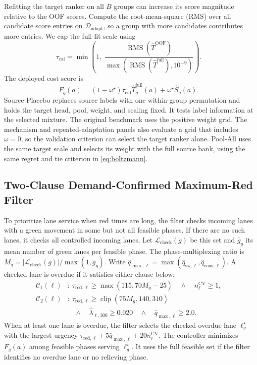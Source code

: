 \documentclass[letterpaper,journal]{IEEEtran}
\DeclareMathOperator{\RMS}{RMS}
\DeclareMathOperator{\clip}{clip}
\begin{document}
Refitting the target ranker on all $B$ groups can increase its score magnitude relative to the OOF scores. Compute the root-mean-square (RMS) over all candidate score entries on $\mathcal{D}_{\mathrm{adapt}}$, so a group with more candidates contributes more entries. We cap the full-fit scale using
\begin{equation}
  \tau_{\mathrm{cal}}=\min\!\left(1,\;
       \frac{\RMS(\widehat T^{\mathrm{OOF}})}
            {\max(\RMS(\widehat T^{\mathrm{full}}),10^{-9})}\right).
  \label{eq:tau_cal}
\end{equation}
The deployed cost score is
\begin{equation}
  F_g(a)=(1-\omega^\star)\tau_{\mathrm{cal}}\widehat T_g^{\mathrm{full}}(a)
     +\omega^\star\widehat S_g(a).
  \label{eq:calibrated_blend}
\end{equation}
Source-Placebo replaces source labels with one within-group permutation and holds the target head, pool, weight, and scaling fixed. It tests label information at the selected mixture. The original benchmark uses the positive weight grid. The mechanism and repeated-adaptation panels also evaluate a grid that includes $\omega=0$, so the validation criterion can select the target ranker alone. Pool-All uses the same target scale and selects its weight with the full source bank, using the same regret and tie criterion in \eqref{eq:boltzmann}.

\subsection{Two-Clause Demand-Confirmed Maximum-Red Filter}
To prioritize lane service when red times are long, the filter checks incoming lanes with a green movement in some but not all feasible phases. If there are no such lanes, it checks all controlled incoming lanes. Let $\mathcal{L}_{\mathrm{check}}(g)$ be this set and $\bar g_g$ its mean number of green lanes per feasible phase. The phase-multiplexing ratio is $M_g=|\mathcal{L}_{\mathrm{check}}(g)|/\max(1,\bar g_g)$. Write $\hat q_{\max,\ell}=\max(\hat q_{\mathrm{sw},\ell},\hat q_{\mathrm{cons},\ell})$. A checked lane is overdue if it satisfies either clause below:
\begin{align}
  \mathcal{C}_1(\ell) &:~ \tau_{\mathrm{red},\ell}\ge\max(115,70M_g-25)
      \quad\wedge\quad n_\ell^{\mathrm{CV}}\ge1,\label{eq:clause1}\\
  \mathcal{C}_2(\ell) &:~ \tau_{\mathrm{red},\ell}\ge\clip(75M_g,140,310)\nonumber\\
  &\quad\wedge\quad\hat\lambda_{\ell,300}\ge0.020
     \quad\wedge\quad\hat q_{\max,\ell}\ge2.0.\label{eq:clause2}
\end{align}
When at least one lane is overdue, the filter selects the checked overdue lane $\ell_g^\star$ with the largest urgency $\tau_{\mathrm{red},\ell}+5\hat q_{\max,\ell}+20n_\ell^{\mathrm{CV}}$. The controller minimizes $F_g(a)$ among feasible phases serving $\ell_g^\star$. It uses the full feasible set if the filter identifies no overdue lane or no relieving phase.
\end{document}
